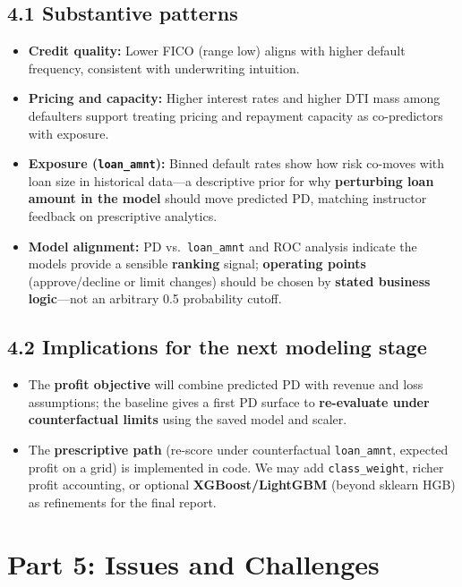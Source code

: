 \documentclass[12pt,letterpaper]{report}
\begin{document}
\subsection*{4.1 Substantive patterns}

\begin{itemize}
    \item \textbf{Credit quality:} Lower FICO (range low) aligns with higher default frequency, consistent with underwriting intuition.
    \item \textbf{Pricing and capacity:} Higher interest rates and higher DTI mass among defaulters support treating pricing and repayment capacity as co-predictors with exposure.
    \item \textbf{Exposure (\texttt{loan\_amnt}):} Binned default rates show how risk co-moves with loan size in historical data---a descriptive prior for why \textbf{perturbing loan amount in the model} should move predicted PD, matching instructor feedback on prescriptive analytics.
    \item \textbf{Model alignment:} PD vs.\ \texttt{loan\_amnt} and ROC analysis indicate the models provide a sensible \textbf{ranking} signal; \textbf{operating points} (approve/decline or limit changes) should be chosen by \textbf{stated business logic}---not an arbitrary 0.5 probability cutoff.
\end{itemize}

\subsection*{4.2 Implications for the next modeling stage}

\begin{itemize}
    \item The \textbf{profit objective} will combine predicted PD with revenue and loss assumptions; the baseline gives a first PD surface to \textbf{re-evaluate under counterfactual limits} using the saved model and scaler.
    \item The \textbf{prescriptive path} (re-score under counterfactual \texttt{loan\_amnt}, expected profit on a grid) is implemented in code. We may add \texttt{class\_weight}, richer profit accounting, or optional \textbf{XGBoost/LightGBM} (beyond sklearn HGB) as refinements for the final report.
\end{itemize}

\section*{Part 5: Issues and Challenges}
\end{document}
